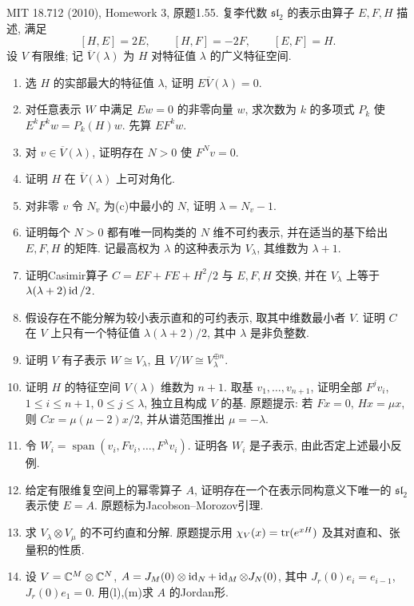 \begin{exercise}\label{hw:1.55}
MIT 18.712 (2010), Homework 3, 原题1.55. 复李代数 $\mathfrak{sl}_2$ 的表示由算子 $E,F,H$ 描述, 满足
\[
[H,E]=2E,\qquad [H,F]=-2F,\qquad [E,F]=H.
\]
设 $V$ 有限维; 记 $\overline V(\lambda)$ 为 $H$ 对特征值 $\lambda$ 的广义特征空间.
\begin{enumerate}[label=(\alph*)]
\item 选 $H$ 的实部最大的特征值 $\lambda$, 证明 $E\overline V(\lambda)=0$.
\item 对任意表示 $W$ 中满足 $Ew=0$ 的非零向量 $w$, 求次数为 $k$ 的多项式 $P_k$ 使 $E^kF^kw=P_k(H)w$. 先算 $EF^kw$.
\item 对 $v\in\overline V(\lambda)$, 证明存在 $N>0$ 使 $F^Nv=0$.
\item 证明 $H$ 在 $\overline V(\lambda)$ 上可对角化.
\item 对非零 $v$ 令 $N_v$ 为(c)中最小的 $N$, 证明 $\lambda=N_v-1$.
\item 证明每个 $N>0$ 都有唯一同构类的 $N$ 维不可约表示, 并在适当的基下给出 $E,F,H$ 的矩阵. 记最高权为 $\lambda$ 的这种表示为 $V_\lambda$, 其维数为 $\lambda+1$.
\item 证明Casimir算子 $C=EF+FE+H^2/2$ 与 $E,F,H$ 交换, 并在 $V_\lambda$ 上等于 $\lambda(\lambda+2)\operatorname{id}/2$.
\item 假设存在不能分解为较小表示直和的可约表示, 取其中维数最小者 $V$. 证明 $C$ 在 $V$ 上只有一个特征值 $\lambda(\lambda+2)/2$, 其中 $\lambda$ 是非负整数.
\item 证明 $V$ 有子表示 $W\cong V_\lambda$, 且 $V/W\cong V_\lambda^{\oplus n}$.
\item 证明 $H$ 的特征空间 $V(\lambda)$ 维数为 $n+1$. 取基 $v_1,\ldots,v_{n+1}$, 证明全部 $F^jv_i$, $1\le i\le n+1$, $0\le j\le\lambda$, 独立且构成 $V$ 的基. 原题提示: 若 $Fx=0$, $Hx=\mu x$, 则 $Cx=\mu(\mu-2)x/2$, 并从谱范围推出 $\mu=-\lambda$.
\item 令 $W_i=\operatorname{span}(v_i,Fv_i,\ldots,F^\lambda v_i)$. 证明各 $W_i$ 是子表示, 由此否定上述最小反例.
\item 给定有限维复空间上的幂零算子 $A$, 证明存在一个在表示同构意义下唯一的 $\mathfrak{sl}_2$ 表示使 $E=A$. 原题标为Jacobson--Morozov引理.
\item 求 $V_\lambda\otimes V_\mu$ 的不可约直和分解. 原题提示用 $\chi_V(x)=\operatorname{tr}(e^{xH})$ 及其对直和、张量积的性质.
\item 设 $V=\mathbb C^M\otimes\mathbb C^N$, $A=J_M(0)\otimes\operatorname{id}_N+\operatorname{id}_M\otimes J_N(0)$, 其中 $J_r(0)e_i=e_{i-1}$, $J_r(0)e_1=0$. 用(l),(m)求 $A$ 的Jordan形.
\end{enumerate}
\end{exercise}
